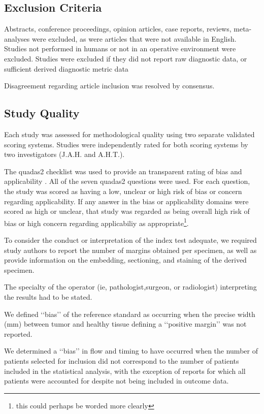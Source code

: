 \subsection{Exclusion Criteria}

Abstracts, conference proceedings, opinion articles, case reports, reviews, meta-analyses were excluded, as were articles that were not available in English.
Studies not performed in humans or not in an operative environment were excluded. 
Studies were excluded if they did not report raw diagnostic data, or sufficient derived diagnostic metric data 

Disagreement regarding article inclusion was resolved by consensus.

\subsection{Study Quality}

Each study was assessed for methodological quality using two separate validated scoring systems.
Studies were independently rated for both scoring systems by two investigators (J.A.H. and A.H.T.).

The \gls{quadas2} checklist was used to provide an transparent rating of bias and applicability \cite{whitingQUADAS2RevisedTool2011}.
All of the seven \gls{quadas2} questions were used.
For each question, the study was scored as having a low, unclear or high risk of bias or concern regarding applicability.
If any answer in the bias or applicability domains were scored as high or unclear, that study was regarded as being overall high risk of bias or high concern regarding applicabiliy as appropriate\footnote{this could perhaps be worded more clearly}.

To consider the conduct or interpretation of the index test adequate, we required study authors to report the number of margins obtained per specimen, as well as provide information on the embedding, sectioning, and staining of the derived specimen. 

The specialty of the operator (ie, pathologist,surgeon, or radiologist) interpreting the results had to be stated. 

We defined ‘‘bias’’ of the reference standard as occurring when the precise width (mm) between tumor and healthy tissue defining a ‘‘positive margin’’ was not reported. 

We determined a ‘‘bias’’ in flow and timing to have occurred when the number of patients selected for inclusion did not correspond to the number of patients included in the statistical analysis, with the exception of reports for which all patients were accounted for despite not being included in outcome data. 

